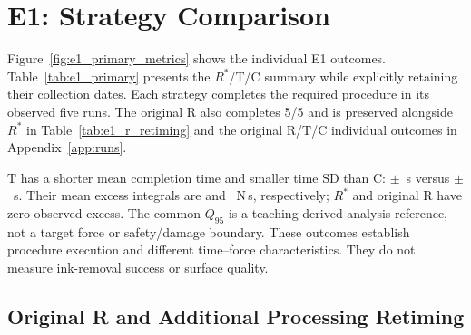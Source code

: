 \FloatBarrier
\section{E1: Strategy Comparison}
\label{sec:e1_results}
Figure~\ref{fig:e1_primary_metrics} shows the individual E1 outcomes. Table~\ref{tab:e1_primary} presents the \(R^{*}\)/T/C summary while explicitly retaining their collection dates. Each strategy completes the required procedure in its observed five runs. The original R also completes 5/5 and is preserved alongside \(R^{*}\) in Table~\ref{tab:e1_r_retiming} and the original R/T/C individual outcomes in Appendix~\ref{app:runs}.

\begin{table}[H]\centering\footnotesize\setlength{\tabcolsep}{3pt}
\caption[E1 strategy summary]{E1 strategy summary: \(R^{*}\) is the separate additional five-run diagnostic on 19 October 2026; T/C are the original five each on 15 October. The 15 displayed runs were not randomized together in a new common block. Time and excess integral are mean \(\pm\) sample SD, \(n=5\) per cell. Original R is retained separately; C5 remains included and C6 excluded.}
\label{tab:e1_primary}
\end{table}


T has a shorter mean completion time and smaller time SD than C: \EoneTTime\(\pm\)\EoneTTimeSD~s versus \EoneCTime\(\pm\)\EoneCTimeSD~s. Their mean excess integrals are \EoneTExcess{} and \EoneCExcess~N\,s, respectively; \(R^{*}\) and original R have zero observed excess. The common \(Q_{95}\) is a teaching-derived analysis reference, not a target force or safety/damage boundary. These outcomes establish procedure execution and different time--force characteristics. They do not measure ink-removal success or surface quality.

\FloatBarrier
\subsection{Original R and Additional Processing Retiming}
\begin{table}[H]\centering\footnotesize
\caption[Original R and additional R retiming]{Original R and separate additional \(R^{*}\), five runs each. Peak feed is a source-path parameter; measured pass speed is calculated on the successful loaded-pass support. Values are mean \(\pm\) sample SD where appropriate. The dates identify distinct collections.}
\label{tab:e1_r_retiming}
\end{table}

